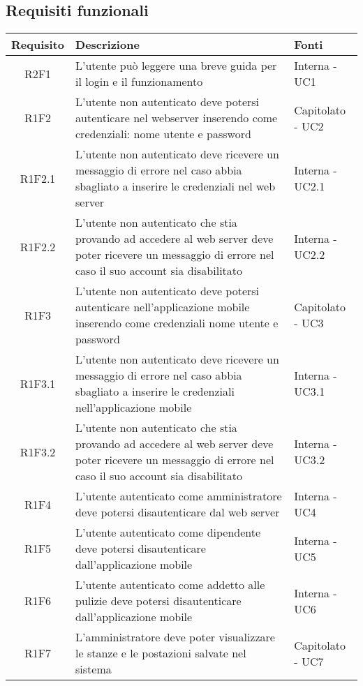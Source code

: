 \subsection{Requisiti funzionali}
\begin{center}
	\begin{longtable}{|c|p{10cm}|p{4cm}|}
		\hline
		\rowcolor{lighter-grayer}
		\textbf{Requisito} & \textbf{Descrizione} & \textbf{Fonti}  \\
		\hline
		\endhead
		
		 R2F1 & L'utente può leggere una breve guida per il login e il funzionamento & Interna - UC1 \\
		\hline
		R1F2	&	L'utente non autenticato deve potersi autenticare nel webserver inserendo come credenziali: nome utente e password & Capitolato - UC2	\\
		\hline
		R1F2.1	&	L'utente non autenticato deve ricevere un messaggio di errore nel caso abbia sbagliato a inserire le credenziali nel web server& Interna - UC2.1	\\
		\hline
		R1F2.2	&	L'utente non autenticato che stia provando ad accedere al web server deve poter ricevere un messaggio di errore nel caso il suo account sia disabilitato& Interna - UC2.2	\\
		\hline
		R1F3	&	L'utente non autenticato deve potersi autenticare nell'applicazione mobile inserendo come credenziali nome utente e password & Capitolato - UC3	\\
		\hline
		R1F3.1	&	L'utente non autenticato deve ricevere un messaggio di errore nel caso abbia sbagliato a inserire le credenziali nell'applicazione mobile& Interna - UC3.1	\\
		\hline
		R1F3.2	&	L'utente non autenticato che stia provando ad accedere al web server deve poter ricevere un messaggio di errore nel caso il suo account sia disabilitato& Interna - UC3.2	\\
		\hline
		R1F4	&	L'utente autenticato come amministratore deve potersi disautenticare dal web server& Interna - UC4	\\
		\hline
		R1F5	&	L'utente autenticato come dipendente deve potersi disautenticare dall'applicazione mobile& Interna - UC5	\\
		\hline
		R1F6	&	L'utente autenticato come addetto alle pulizie deve potersi disautenticare dall'applicazione mobile& Interna - UC6	\\
		\hline
		R1F7&L'amministratore deve poter visualizzare le stanze e le postazioni salvate nel sistema& Capitolato - UC7	\\

\end{longtable}
\end{center}
